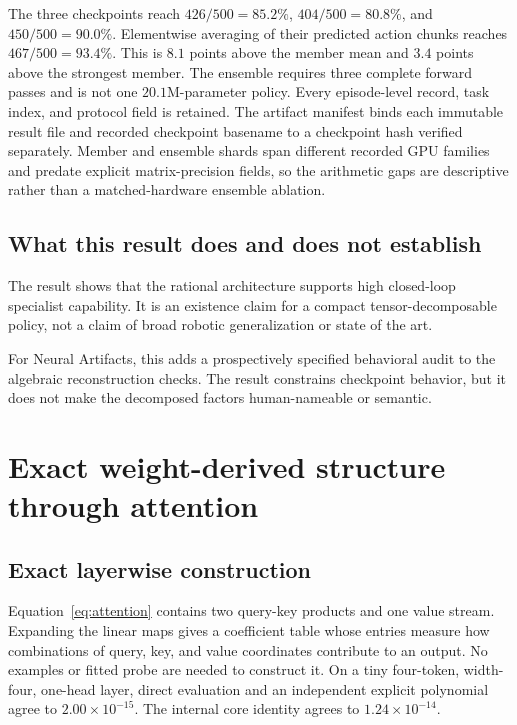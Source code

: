 \documentclass{article}
\begin{document}
The three checkpoints reach $426/500=85.2\%$, $404/500=80.8\%$, and $450/500=90.0\%$.
Elementwise averaging of their predicted action chunks reaches $467/500=93.4\%$. This is $8.1$
points above the member mean and $3.4$ points above the strongest member. The ensemble requires
three complete forward passes and is not one $20.1$M-parameter policy. Every episode-level record,
task index, and protocol field is retained. The artifact manifest binds each immutable result file
and recorded checkpoint basename to a checkpoint hash verified separately. Member and ensemble
shards span different recorded GPU families and predate explicit matrix-precision fields, so the
arithmetic gaps are descriptive rather than a matched-hardware ensemble ablation.

\subsection{What this result does and does not establish}

The result shows that the rational architecture supports high closed-loop specialist capability.
It is an existence claim for a compact tensor-decomposable policy, not a
claim of broad robotic generalization or state of the art.





For Neural Artifacts, this adds a prospectively specified behavioral audit to the algebraic
reconstruction checks. The result constrains checkpoint behavior, but it does not make the
decomposed factors human-nameable or semantic.

\section{Exact weight-derived structure through attention}
\label{sec:exactattention}

\subsection{Exact layerwise construction}

Equation~\ref{eq:attention} contains two query-key products and one value stream. Expanding
the linear maps gives a coefficient table whose entries measure how combinations of query,
key, and value coordinates contribute to an output. No examples or fitted probe are needed to
construct it. On a tiny four-token, width-four, one-head layer, direct evaluation
and an independent explicit polynomial agree to $2.00\times10^{-15}$. The internal core
identity agrees to $1.24\times10^{-14}$.
\end{document}
